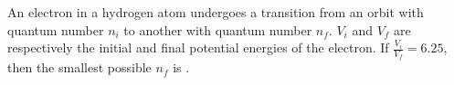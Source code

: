 
    \item An electron in a hydrogen atom undergoes a transition from an orbit with quantum number \( n_i \) to another with quantum number \( n_f \). \( V_i \) and \( V_f \) are respectively the initial and final potential energies of the electron. If \( \frac{V_i}{V_f} = 6.25 \), then the smallest possible \( n_f \) is \underline{\hspace{2.5 cm}}.
